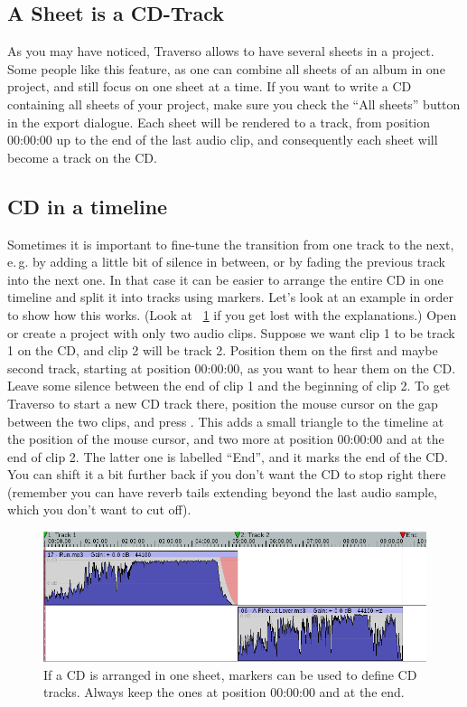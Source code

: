 \subsection{A Sheet is a CD-Track}
As you may have noticed, Traverso allows to have several sheets in a project. Some people like this feature, as one can combine all sheets of an album in one project, and still focus on one sheet at a time. If you want to write a CD containing all sheets of your project, make sure you check the ``All sheets'' button in the export dialogue. Each sheet will be rendered to a track, from position 00:00:00 up to the end of the last audio clip, and consequently each sheet will become a track on the CD.

\subsection{CD in a timeline}
Sometimes it is important to fine-tune the transition from one track to the next, e.\,g. by adding a little bit of silence in between, or by fading the previous track into the next one. In that case it can be easier to arrange the entire CD in one timeline and split it into tracks using markers. Let's look at an example in order to show how this works. (Look at \FigT~\ref{fig_markers01} if you get lost with the explanations.) Open or create a project with only two audio clips. Suppose we want clip 1 to be track 1 on the CD, and clip 2 will be track 2. Position them on the first and maybe second track, starting at position 00:00:00, as you want to hear them on the CD. Leave some silence between the end of clip 1 and the beginning of clip 2. To get Traverso to start a new CD track there, position the mouse cursor on the gap between the two clips, and press . This adds a small triangle to the timeline at the position of the mouse cursor, and two more at position 00:00:00 and at the end of clip 2. The latter one is labelled ``End'', and it marks the end of the CD. You can shift it a bit further back if you don't want the CD to stop right there (remember you  can have reverb tails extending beyond the last audio sample, which you don't want to cut off).

\begin{figure}[t]
 \centering\includegraphics[width=\textwidth]{../images/markers01}
 \caption{If a CD is arranged in one sheet, markers can be used to define CD tracks. Always keep the ones at position 00:00:00 and at the end.}
 \label{fig_markers01}
\end{figure}

